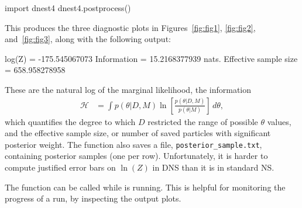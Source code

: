 \documentclass[article, nojss]{jss}
\begin{document}
\begin{CodeChunk}
\begin{CodeInput}
import dnest4
dnest4.postprocess()
\end{CodeInput}
\end{CodeChunk}
This produces the three diagnostic plots in Figures~\ref{fig:fig1},
\ref{fig:fig2}, and~\ref{fig:fig3}, along with the following output:
\begin{CodeChunk}
\begin{CodeOutput}
log(Z) = -175.545067073
Information = 15.2168377939 nats.
Effective sample size = 658.958278958
\end{CodeOutput}
\end{CodeChunk}
These are the natural log of the marginal likelihood, the
information
\begin{align}
\mathcal{H} &= \int p(\theta|D, M)
\ln\left[\frac{p(\theta | D, M)}{p(\theta | M)}\right] \, d\theta,
\end{align}
which quantifies the degree to which $D$ restricted the
range of possible $\theta$ values,
and the effective sample size,
or number of saved particles with significant posterior weight.
The  function also saves a file,
{\tt posterior\_sample.txt}, containing posterior samples (one per row).
Unfortunately, it is harder to compute justified error bars on $\ln(Z)$
in DNS than it is in standard NS.

The  function can be called while  is running.
This is helpful for monitoring the progress of a run, by inspecting the
output plots.
\end{document}
